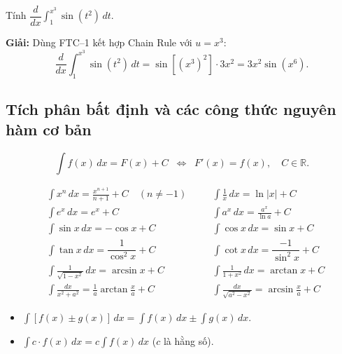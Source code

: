 \documentclass[12pt,a4paper]{article}
\begin{document}
\begin{vidu}
  Tính $\dfrac{d}{dx}\displaystyle\int_1^{x^3} \sin(t^2)\,dt$.

  \medskip\textbf{Giải:}
  Dùng FTC--1 kết hợp Chain Rule với $u = x^3$:
  \[
    \frac{d}{dx}\int_1^{x^3} \sin(t^2)\,dt = \sin\!\left[(x^3)^2\right] \cdot 3x^2 = 3x^2 \sin(x^6).
  \]
\end{vidu}

\subsection{Tích phân bất định và các công thức nguyên hàm cơ bản}

\begin{dinhnghia}
  \[
    \int f(x)\,dx = F(x) + C \;\;\Leftrightarrow\;\; F'(x) = f(x),\quad C \in \mathbb{R}.
  \]
\end{dinhnghia}

\begin{congthuc}[title={Bảng nguyên hàm cơ bản}]
  \begin{align*}
    &\int x^n\,dx = \frac{x^{n+1}}{n+1} + C \quad (n \ne -1)
    &\quad&
    \int \frac{1}{x}\,dx = \ln|x| + C \\[5pt]
    &\int e^x\,dx = e^x + C
    &&
    \int a^x\,dx = \frac{a^x}{\ln a} + C \\[5pt]
    &\int \sin x\,dx = -\cos x + C
    &&
    \int \cos x\,dx = \sin x + C \\[5pt]
    &\int \tan x\,dx = \dfrac{1}{\cos^2 x} + C
    &&
    \int \cot x\,dx = \dfrac{-1}{\sin^2 x} + C \\[5pt]
    &\int \frac{1}{\sqrt{1-x^2}}\,dx = \arcsin x + C
    &&
    \int \frac{1}{1+x^2}\,dx = \arctan x + C \\[5pt]
    &\int \frac{dx}{x^2+a^2} = \frac{1}{a}\arctan\frac{x}{a} + C
    &&
    \int \frac{dx}{\sqrt{a^2-x^2}} = \arcsin\frac{x}{a} + C
  \end{align*}
\end{congthuc}

\begin{tinhchat}
  \begin{itemize}
    \item $\displaystyle\int [f(x) \pm g(x)]\,dx = \int f(x)\,dx \pm \int g(x)\,dx$.
    \item $\displaystyle\int c\cdot f(x)\,dx = c \int f(x)\,dx$ ($c$ là hằng số).
  \end{itemize}
\end{tinhchat}
\end{document}
